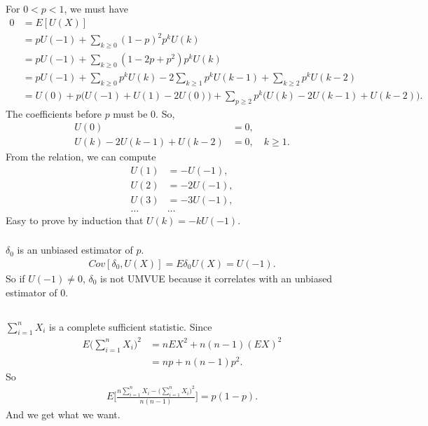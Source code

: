 \subsubsection{} %

For $0<p<1$, we must have
\begin{align}
    0
        &=E[U(X)] \\
        &= p U(-1) + \sum_{k\ge 0} (1-p)^2 p^k U(k) \\
        &= p U(-1) + \sum_{k\ge 0} (1-2p+p^2) p^k U(k) \\
        &= p U(-1) + \sum_{k\ge 0} p^k U(k) - 2 \sum_{k\ge 1} p^k U(k-1) + \sum_{k\ge 2} p^k U(k-2) \\
        &= U(0) + p\big(U(-1)+U(1)-2U(0)\big) + \sum_{p\ge2}p^k\big(U(k) -2U(k-1) +U(k-2)\big).
\end{align}
The coefficients before $p$ must be $0$. So,
\begin{align}
    U(0) &= 0, \\
    U(k) -2U(k-1) +U(k-2) &= 0, \quad k\ge 1.
\end{align}
From the relation, we can compute
\begin{align}
    U(1) &= -U(-1), \\
    U(2) &= -2U(-1), \\
    U(3) &= -3U(-1), \\
    \dots&\dots
\end{align}
Easy to prove by induction that $U(k)=-kU(-1)$.

\subsubsection{} %

$\delta_0$ is an unbiased estimator of $p$.
\begin{align}
    Cov[\delta_0, U(X)] = E \delta_0 U(X) = U(-1).
\end{align}
So if $U(-1)\ne 0$, $\delta_0$ is not UMVUE because it correlates with
an unbiased estimator of $0$.

\subsection{} %

$\sum_{i=1}^n X_i$ is a complete sufficient statistic.
Since
\begin{align}
    E \Big(\sum_{i=1}^n X_i\Big)^2
        &= n E X^2 + n(n-1) (E X)^2 \\
        &= np + n(n-1)p^2.
\end{align}
So
\begin{align}
    E \Bigg[\frac{n \sum_{i=1}^n X_i - \Big(\sum_{i=1}^n X_i\Big)^2 }{n(n-1)}\Bigg] = p(1-p).
\end{align}
And we get what we want.

\subsection{} %
